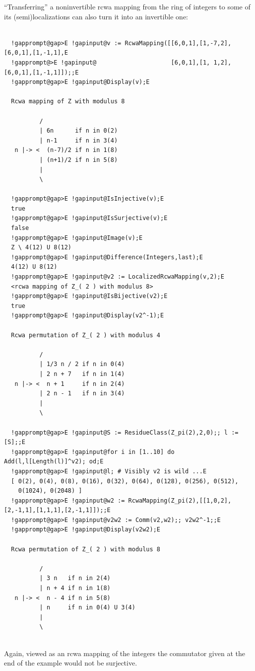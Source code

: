 \documentclass[a4paper,11pt]{report}
\begin{document}
{{ ``Transferring'' a non\texttt{}invertible rcwa mapping from the ring of integers to
some of its (semi)localizations can also turn it into an invertible one: 
\begin{Verbatim}[commandchars=!@E,fontsize=\small,frame=single,label=Example]
  
  !gapprompt@gap>E !gapinput@v := RcwaMapping([[6,0,1],[1,-7,2],[6,0,1],[1,-1,1],E
  !gapprompt@>E !gapinput@                     [6,0,1],[1, 1,2],[6,0,1],[1,-1,1]]);;E
  !gapprompt@gap>E !gapinput@Display(v);E
  
  Rcwa mapping of Z with modulus 8
  
          /
          | 6n      if n in 0(2)
          | n-1     if n in 3(4)
   n |-> <  (n-7)/2 if n in 1(8)
          | (n+1)/2 if n in 5(8)
          |
          \
  
  !gapprompt@gap>E !gapinput@IsInjective(v);E
  true
  !gapprompt@gap>E !gapinput@IsSurjective(v);E
  false
  !gapprompt@gap>E !gapinput@Image(v);E
  Z \ 4(12) U 8(12)
  !gapprompt@gap>E !gapinput@Difference(Integers,last);E
  4(12) U 8(12)
  !gapprompt@gap>E !gapinput@v2 := LocalizedRcwaMapping(v,2);E
  <rcwa mapping of Z_( 2 ) with modulus 8>
  !gapprompt@gap>E !gapinput@IsBijective(v2);E
  true
  !gapprompt@gap>E !gapinput@Display(v2^-1);E
  
  Rcwa permutation of Z_( 2 ) with modulus 4
  
          /
          | 1/3 n / 2 if n in 0(4)
          | 2 n + 7   if n in 1(4)
   n |-> <  n + 1     if n in 2(4)
          | 2 n - 1   if n in 3(4)
          |
          \
  
  !gapprompt@gap>E !gapinput@S := ResidueClass(Z_pi(2),2,0);; l := [S];;E
  !gapprompt@gap>E !gapinput@for i in [1..10] do Add(l,l[Length(l)]^v2); od;E
  !gapprompt@gap>E !gapinput@l; # Visibly v2 is wild ...E
  [ 0(2), 0(4), 0(8), 0(16), 0(32), 0(64), 0(128), 0(256), 0(512),
    0(1024), 0(2048) ]
  !gapprompt@gap>E !gapinput@w2 := RcwaMapping(Z_pi(2),[[1,0,2],[2,-1,1],[1,1,1],[2,-1,1]]);;E
  !gapprompt@gap>E !gapinput@v2w2 := Comm(v2,w2);; v2w2^-1;;E
  !gapprompt@gap>E !gapinput@Display(v2w2);E
  
  Rcwa permutation of Z_( 2 ) with modulus 8
  
          /
          | 3 n   if n in 2(4)
          | n + 4 if n in 1(8)
   n |-> <  n - 4 if n in 5(8)
          | n     if n in 0(4) U 3(4)
          |
          \
  
\end{Verbatim}
 Again, viewed as an rcwa mapping of the integers the commutator given at the
end of the example would not be surjective. 

}}
\end{document}
